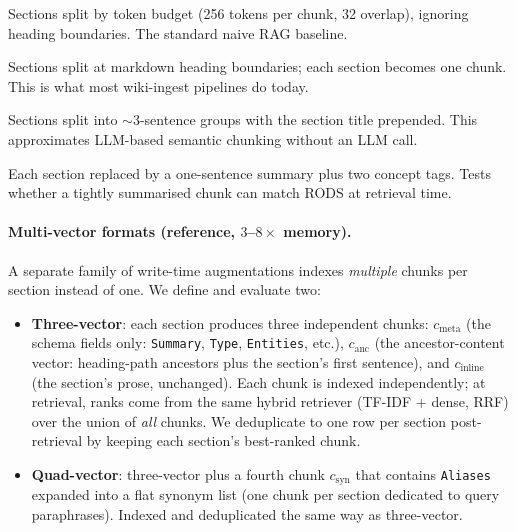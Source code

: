 \documentclass[11pt]{article}
\begin{document}
\begin{description}[noitemsep,topsep=0.2em,leftmargin=2em]
  \item[L0 — Fixed-size chunks] Sections split by token budget
        (256 tokens per chunk, 32 overlap), ignoring heading boundaries.
        The standard naive RAG baseline.
  \item[L1 — Heading-aware chunks] Sections split at markdown heading
        boundaries; each section becomes one chunk. This is what most
        wiki-ingest pipelines do today.
  \item[L2 — Semantic (sentence-boundary) chunks] Sections split into
        $\sim$3-sentence groups with the section title prepended. This
        approximates LLM-based semantic chunking without an LLM call.
  \item[L3 — LLM-summary chunks] Each section replaced by a one-sentence
        summary plus two concept tags. Tests whether a tightly summarised
        chunk can match RODS at retrieval time.
\end{description}

\paragraph{Multi-vector formats (reference, $3$--$8\times$ memory).}
A separate family of write-time augmentations indexes \emph{multiple}
chunks per section instead of one. We define and evaluate two:

\begin{itemize}[noitemsep,topsep=0.2em,leftmargin=1.5em]
\item \textbf{Three-vector}: each section produces three independent
      chunks: $c_{\text{meta}}$ (the schema fields only:
      \texttt{Summary}, \texttt{Type}, \texttt{Entities}, etc.),
      $c_{\text{anc}}$ (the ancestor-content vector: heading-path
      ancestors plus the section's first sentence), and
      $c_{\text{inline}}$ (the section's prose, unchanged). Each chunk
      is indexed independently; at retrieval, ranks come from the
      same hybrid retriever (TF-IDF + dense, RRF) over the union of
      \emph{all} chunks. We deduplicate to one row per section
      post-retrieval by keeping each section's best-ranked chunk.
\item \textbf{Quad-vector}: three-vector plus a fourth chunk
      $c_{\text{syn}}$ that contains \texttt{Aliases} expanded into a
      flat synonym list (one chunk per section dedicated to query
      paraphrases). Indexed and deduplicated the same way as
      three-vector.
\end{itemize}
\end{document}
